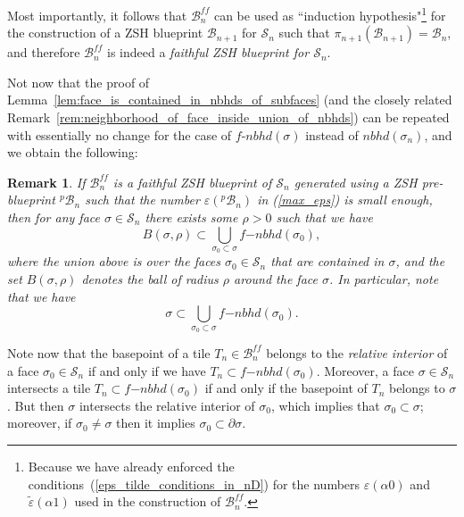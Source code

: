 \documentclass[12pt,letterpaper]{article}
\newtheorem{rem}[thm]{Remark}
\renewcommand{\S}{\mathcal{S}}
\newcommand{\B}{\mathcal{B}}
\newcommand{\eps}{\varepsilon}
\newcommand{\et}{\tilde\eps}
\newcommand{\nbhd}{\mathit{nbhd}}
\renewcommand{\a}{\alpha}
\begin{document}
Most importantly, it follows that  $\B_n^\mathit{ff}$ can be used as ``induction hypothesis"\footnote{Because we have already enforced the conditions~(\ref{eps_tilde_conditions_in_nD}) for the numbers $\eps(\a 0)$ and $\et(\a 1)$ used in the construction of $\B_n^\mathit{ff}$.} for the construction of a  ZSH blueprint $\B_{n+1}$ for $\S_n$ such that $\pi_{n+1}(\B_{n+1}) = \B_n$, and therefore $\B_n^\mathit{ff}$ is indeed a {\em faithful ZSH blueprint for $\S_n$}.  









\bigskip

\bigskip

\bigskip

\bigskip





\noindent
Not now that the proof of Lemma~\ref{lem:face_is_contained_in_nbhds_of_subfaces} (and the closely related Remark~\ref{rem:neighborhood_of_face_inside_union_of_nbhds}) can be repeated with essentially no change for the case of $f$-$\nbhd(\sigma)$ instead of $\nbhd(\sigma_n)$, and we obtain the following:

\begin{rem}
\label{rem:neighborhood_of_face_inside_union_of_nbhds_FOR_FAITHFUL}
If $\B_n^\mathit{ff}$ is a faithful ZSH blueprint of $\S_n$ generated using a ZSH pre-blueprint $^p\!\B_n$ such that the number $\eps(^p\!\B_n)$ in (\ref{max_eps}) is small enough,
then for any face $\sigma \in \S_n$ there exists some $\rho>0$ such that  we have 
%
\begin{equation}
\label{eqn:neighborhood_of_face_inside_union_of_nbhds_FOR_FAITHFUL}
B(\sigma, \rho) \subset \bigcup_{\sigma_0 \subset \sigma} f\mathrm{-}\nbhd(\sigma_0),
\end{equation}
%
where the union above is over the faces $\sigma_0 \in \S_n$ that are contained in $\sigma$, and the set $B(\sigma, \rho)$ denotes the ball of radius $\rho$ around the face $\sigma$.
In particular, note that we have 
%
\begin{equation}
\label{eqn:face_inside_union_of_nbhds}
\sigma \subset \bigcup_{\sigma_0 \subset \sigma} f\mathrm{-}\nbhd(\sigma_0).
\end{equation}
%
\end{rem}


Note now that the basepoint of a tile $T_n \in \B_n^\mathit{ff}$ belongs to the {\em relative interior} of a face $\sigma_0 \in \S_n$ if and only if we have $T_n \subset f\mathrm{-}\nbhd(\sigma_0)$. Moreover, a face $\sigma \in \S_n$ intersects a tile $T_n \subset f\mathrm{-}\nbhd(\sigma_0)$ if and only if the basepoint of $T_n$ belongs to $\sigma$.  But then $\sigma$ intersects the relative interior of $\sigma_0$, which implies that $\sigma_0 \subset \sigma$; moreover, if $\sigma_0 \neq \sigma$ then it implies $\sigma_0 \subset \partial \sigma$.
\end{document}
